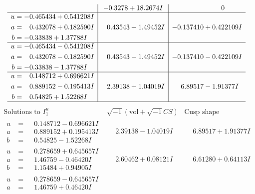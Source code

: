 \documentclass[1p]{elsarticle_modified}
\theoremstyle{definition}
\newcommand{\I}{\sqrt{-1}}
\begin{document}
$$\begin{array}{c|c|c}
 & -0.3278 + 18.2674 I & \phantom{-0.000000 } 0 \\ \hline\begin{aligned}
u &= -0.465434 + 0.541208 I \\
a &= \phantom{-}0.432078 + 0.182590 I \\
b &= -0.33838 + 1.37788 I\end{aligned}
 & \phantom{-}0.43543 + 1.49452 I & -0.137410 + 0.422109 I \\ \hline\begin{aligned}
u &= -0.465434 - 0.541208 I \\
a &= \phantom{-}0.432078 - 0.182590 I \\
b &= -0.33838 - 1.37788 I\end{aligned}
 & \phantom{-}0.43543 - 1.49452 I & -0.137410 - 0.422109 I \\ \hline\begin{aligned}
u &= \phantom{-}0.148712 + 0.696621 I \\
a &= \phantom{-}0.889152 - 0.195413 I \\
b &= \phantom{-}0.54825 + 1.52268 I\end{aligned}
 & \phantom{-}2.39138 + 1.04019 I & \phantom{-}6.89517 - 1.91377 I\\
 \hline 
 \end{array}$$\newpage$$\begin{array}{c|c|c}  
\text{Solutions to }I^u_{1}& \I (\text{vol} + \sqrt{-1}CS) & \text{Cusp shape}\\
 \hline 
\begin{aligned}
u &= \phantom{-}0.148712 - 0.696621 I \\
a &= \phantom{-}0.889152 + 0.195413 I \\
b &= \phantom{-}0.54825 - 1.52268 I\end{aligned}
 & \phantom{-}2.39138 - 1.04019 I & \phantom{-}6.89517 + 1.91377 I \\ \hline\begin{aligned}
u &= \phantom{-}0.278659 + 0.645657 I \\
a &= \phantom{-}1.46759 - 0.46420 I \\
b &= \phantom{-}1.15484 + 0.94905 I\end{aligned}
 & \phantom{-}2.60462 + 0.08121 I & \phantom{-}6.61280 + 0.64113 I \\ \hline\begin{aligned}
u &= \phantom{-}0.278659 - 0.645657 I \\
a &= \phantom{-}1.46759 + 0.46420 I \\

\end{aligned}
\end{array}$$
\end{document}
